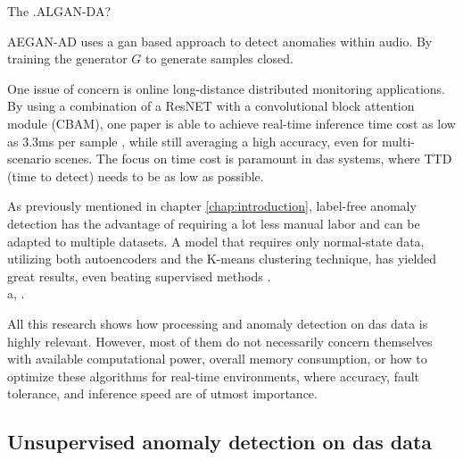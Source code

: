 {The  \cite{bashar2023algan}.ALGAN-DA?

AEGAN-AD \cite{jiang2023unsupervised} uses a \acrshort{gan} based approach to detect anomalies within audio. By training the generator $G$ to generate samples closed. 


One issue of concern is online long-distance distributed monitoring applications. By using a combination of a ResNET with a convolutional block attention module (CBAM), one paper is able to achieve real-time inference time cost as low as 3.3ms per sample \cite{photonics9100677}, while still averaging a high accuracy, even for multi-scenario scenes. The focus on time cost is paramount in \acrshort{das} systems, where TTD (time to detect) needs to be as low as possible.




As previously mentioned in chapter \ref{chap:introduction}, label-free anomaly detection has the advantage of requiring a lot less manual labor and can be adapted to multiple datasets. A model that requires only normal-state data, utilizing both autoencoders and the K-means clustering technique, has yielded great results, even beating supervised methods \cite{s23084094}. \\ 

a, \cite{10.14778/3538598.3538602} \cite{10.1145/3444690}.

All this research shows how processing and anomaly detection on \acrshort{das} data is highly relevant. However, most of them do not necessarily concern themselves with available computational power, overall memory consumption, or how to optimize these algorithms for real-time environments, where accuracy, fault tolerance, and inference speed are of utmost importance.

\subsection{Unsupervised anomaly detection on \acrshort{das} data}
}